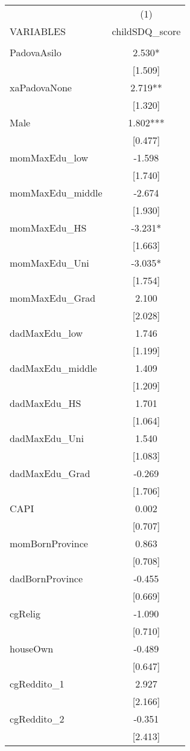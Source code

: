 \documentclass[]{article}
\begin{document}
\begin{tabular}{lc} \hline
 & (1) \\
VARIABLES & childSDQ\_score \\ \hline
 &  \\
PadovaAsilo & 2.530* \\
 & [1.509] \\
xaPadovaNone & 2.719** \\
 & [1.320] \\
Male & 1.802*** \\
 & [0.477] \\
momMaxEdu\_low & -1.598 \\
 & [1.740] \\
momMaxEdu\_middle & -2.674 \\
 & [1.930] \\
momMaxEdu\_HS & -3.231* \\
 & [1.663] \\
momMaxEdu\_Uni & -3.035* \\
 & [1.754] \\
momMaxEdu\_Grad & 2.100 \\
 & [2.028] \\
dadMaxEdu\_low & 1.746 \\
 & [1.199] \\
dadMaxEdu\_middle & 1.409 \\
 & [1.209] \\
dadMaxEdu\_HS & 1.701 \\
 & [1.064] \\
dadMaxEdu\_Uni & 1.540 \\
 & [1.083] \\
dadMaxEdu\_Grad & -0.269 \\
 & [1.706] \\
CAPI & 0.002 \\
 & [0.707] \\
momBornProvince & 0.863 \\
 & [0.708] \\
dadBornProvince & -0.455 \\
 & [0.669] \\
cgRelig & -1.090 \\
 & [0.710] \\
houseOwn & -0.489 \\
 & [0.647] \\
cgReddito\_1 & 2.927 \\
 & [2.166] \\
cgReddito\_2 & -0.351 \\
 & [2.413] \\

\end{tabular}
\end{document}
